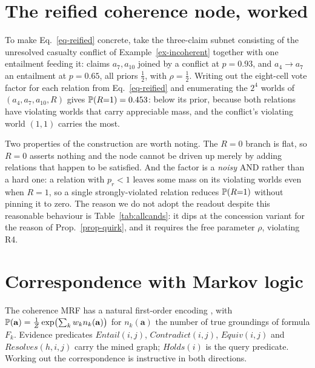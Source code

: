 \section{The reified coherence node, worked}
\label{app-reified}

To make Eq.~\ref{eq-reified} concrete, take the three-claim subnet consisting of the unresolved
casualty conflict of Example~\ref{ex-incoherent} together with one entailment feeding it: claims
$a_7,a_{10}$ joined by a conflict at $p=0.93$, and $a_4\to a_7$ an entailment at $p=0.65$, all priors
$\tfrac12$, with $\rho=\tfrac12$. Writing out the eight-cell vote factor for each relation from
Eq.~\ref{eq-reified} and enumerating the $2^4$ worlds of $(a_4,a_7,a_{10},R)$ gives
$\mathbb{P}\!\left( R{=}1 \right)=0.453$: below its prior, because both relations have violating worlds that carry
appreciable mass, and the conflict's violating world $(1,1)$ carries the most.

Two properties of the construction are worth noting. The $R=0$ branch is flat, so $R=0$ asserts nothing
and the node cannot be driven up merely by adding relations that happen to be satisfied. And the factor
is a \emph{noisy} AND rather than a hard one: a relation with $p_r<1$ leaves some mass on its violating
worlds even when $R=1$, so a single strongly-violated relation reduces $\mathbb{P}\!\left( R{=}1 \right)$ without pinning it
to zero. The reason we do not adopt the readout despite this reasonable behaviour is
Table~\ref{tab:allcands}: it dips at the concession variant for the reason of
Prop.~\ref{prop-quirk}, and it requires the free parameter $\rho$, violating R4.

\section{Correspondence with Markov logic}
\label{app-mln}

The coherence MRF has a natural first-order encoding \citep{mln}, with
$\mathbb{P}\!\left( \mathbf{a} \right)=\tfrac1Z\exp\bigl(\sum_k w_k n_k(\mathbf{a})\bigr)$ for $n_k(\mathbf{a})$ the number of
true groundings of formula $F_k$. Evidence predicates $\mathit{Entail}(i,j)$,
$\mathit{Contradict}(i,j)$, $\mathit{Equiv}(i,j)$ and $\mathit{Resolves}(h,i,j)$ carry the mined graph;
$\mathit{Holds}(i)$ is the query predicate. Working out the correspondence is instructive in both
directions.

